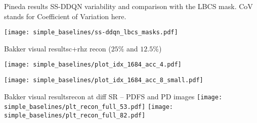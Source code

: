 \begin{frame}{Pineda results}
    SS-DDQN variability and comparison with the LBCS mask. CoV stands for Coefficient of Variation here.
        \begin{center}
            \texttt{[image: simple\_baselines/ss-ddqn\_lbcs\_masks.pdf]}    
        \end{center}
\end{frame}


\begin{frame}{Bakker visual results}{c+rhz recon ($25\%$ and $12.5\%$)}
    \centering
    \begin{minipage}[c]{0.46\linewidth}
        \texttt{[image: simple\_baselines/plot\_idx\_1684\_acc\_4.pdf]}    
    \end{minipage}
    \hfill
    \begin{minipage}[c]{0.46\linewidth}
        \texttt{[image: simple\_baselines/plot\_idx\_1684\_acc\_8\_small.pdf]}    
    \end{minipage}
\end{frame}

\begin{frame}{Bakker visual results}{recon at diff SR -- PDFS and PD images}
    \centering
    \texttt{[image: simple\_baselines/plt\_recon\_full\_53.pdf]}
    \hfill
    \texttt{[image: simple\_baselines/plt\_recon\_full\_82.pdf]}
\end{frame}

